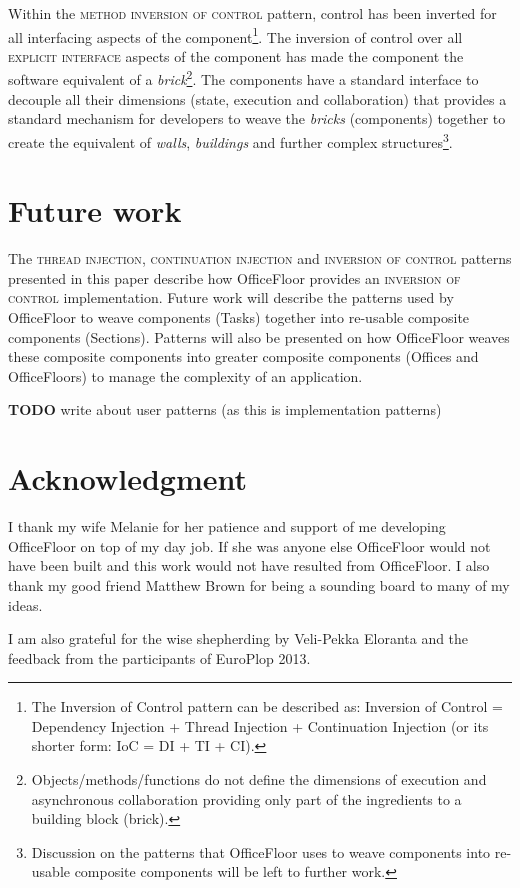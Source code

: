 \documentclass[prodmode]{style/acmlarge}
\begin{document}
Within the \textsc{method inversion of control} pattern, control has been
inverted for all interfacing aspects of the component\footnote{The Inversion of
Control pattern can be described as: Inversion of Control = Dependency Injection
+ Thread Injection + Continuation Injection (or its shorter form: IoC = DI + TI
+ CI).}.  The inversion of control over all \textsc{explicit interface} aspects
of the component has made the component the software equivalent of a
\textit{brick}\footnote{Objects/methods/functions do not define the dimensions
of execution and asynchronous collaboration providing only part of the
ingredients to a building block (brick).}.  The components have a standard
interface to decouple all their dimensions (state, execution and collaboration)
that provides a standard mechanism for developers to weave the \textit{bricks}
(components) together to create the equivalent of \textit{walls},
\textit{buildings} and further complex structures\footnote{Discussion on the
patterns that OfficeFloor \cite{officefloor} uses to weave components into
re-usable composite components will be left to further work.}.



\section{Future work}

The \textsc{thread injection}, \textsc{continuation injection} and
\textsc{inversion of control} patterns presented in this paper describe how
OfficeFloor \cite{officefloor} provides an \textsc{inversion of control}
implementation.  Future work will describe the patterns used by OfficeFloor to
weave components (Tasks) together into re-usable composite components
(Sections).  Patterns will also be presented on how OfficeFloor weaves these
composite components into greater composite components (Offices and
OfficeFloors) to manage the complexity of an application.

\textbf{TODO} write about user patterns (as this is implementation patterns)



\section*{Acknowledgment} 

I thank my wife Melanie for her patience and support
of me developing OfficeFloor on top of my day job.  If she was anyone else
OfficeFloor would not have been built and this work would not have resulted from
OfficeFloor.  I also thank my good friend Matthew Brown for being a sounding
board to many of my ideas.

I am also grateful for the wise shepherding by Veli-Pekka Eloranta and the
feedback from the participants of EuroPlop 2013.




\end{document}
